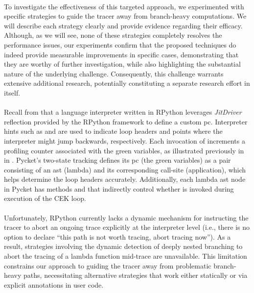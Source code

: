     \paragraph{}%
      To investigate the effectiveness of this targeted approach, we experimented with specific strategies to guide the tracer away from branch-heavy computations. We will describe each strategy clearly and provide evidence regarding their efficacy. Although, as we will see, none of these strategies completely resolves the performance issues, our experiments confirm that the proposed techniques do indeed provide measurable improvements in specific cases, demonstrating that they are worthy of further investigation, while also highlighting the substantial nature of the underlying challenge. Consequently, this challenge warrants extensive additional research, potentially constituting a separate research effort in itself.

    \paragraph{}%
      Recall from  that a language interpreter written in RPython leverages \emph{JitDriver} reflection provided by the RPython framework to define a custom \gls{pc}. Interpreter hints such as  and  are used to indicate loop headers and points where the interpreter might jump backwards, respectively. Each invocation of  increments a profiling counter associated with the green variables, as illustrated previously in  in . Pycket’s two-state tracking defines its \gls{pc} (the green variables) as a pair consisting of an \gls{ast} (lambda) and its corresponding call-site (application), which helps determine the loop headers accurately. Additionally, each lambda \gls{ast} node in Pycket has methods  and  that indirectly control whether  is invoked during execution of the CEK loop.

    \paragraph{}%
      Unfortunately, RPython currently lacks a dynamic mechanism for instructing the tracer to abort an ongoing trace explicitly at the interpreter level (i.e., there is no option to declare “this path is not worth tracing, abort tracing now”). As a result, strategies involving the dynamic detection of deeply nested branching to abort the tracing of a lambda function mid-trace are unavailable. This limitation constrains our approach to guiding the tracer away from problematic branch-heavy paths, necessitating alternative strategies that work either statically or via explicit annotations in user code.

